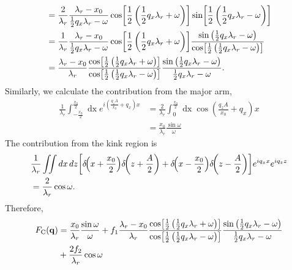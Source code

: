 \documentclass[12pt,letterpaper]{article}
\newcommand{\dx}{\mathop{dx}}
\newcommand{\dz}{\mathop{dz}}
\newcommand{\FC}{F_\mathrm{C}}
\begin{document}
\begin{align}
  &= \frac{2}{\lambda_r}\frac{\lambda_r-x_0}{\frac{1}{2}q_x\lambda_r - \omega} 
     \cos\mathopen{}\left[ \frac{1}{2}\left(\frac{1}{2}q_x\lambda_r + \omega\right) \right]\mathclose{} 
     \sin\mathopen{}\left[ \frac{1}{2}\left(\frac{1}{2}q_x\lambda_r - \omega\right) \right]\mathclose{} \nonumber\\
  &= \frac{1}{\lambda_r}\frac{\lambda_r-x_0}{\frac{1}{2}q_x\lambda_r - \omega} 
     \cos\mathopen{}\left[ \frac{1}{2}\left(\frac{1}{2}q_x\lambda_r + \omega\right) \right]\mathclose{} 
     \frac{\sin\left(\frac{1}{2}q_x\lambda_r - \omega \right)}
          {\cos\mathopen{}\left[ \frac{1}{2}\left(\frac{1}{2}q_x\lambda_r - \omega\right) \right]\mathclose{}} \nonumber\\
  &= \frac{\lambda_r-x_0}{\lambda_r}
     \frac{\cos\mathopen{}\left[ \frac{1}{2}\left(\frac{1}{2}q_x\lambda_r + \omega\right) \right]\mathclose{}}
          {\cos\mathopen{}\left[ \frac{1}{2}\left(\frac{1}{2}q_x\lambda_r - \omega\right) \right]\mathclose{}}
     \frac{\sin\left(\frac{1}{2}q_x\lambda_r - \omega\right)}
          {\frac{1}{2}q_x\lambda_r - \omega}.
\end{align}
Similarly, we calculate the contribution from the major arm,
\begin{align}
  \frac{1}{\lambda_r}\int_{-\frac{x_0}{2}}^{\frac{x_0}{2}}\dx 
  e^{i\left(\frac{q_zA}{x_0} + q_x \right)x}
  &= \frac{2}{\lambda_r}\int_{0}^{\frac{x_0}{2}}\dx \cos\left(\frac{q_zA}{x_0} + q_x\right)x \nonumber\\ 
  &= \frac{x_0}{\lambda_r}\frac{\sin\omega}{\omega}
\end{align}
The contribution from the kink region is 
\begin{align}
  & \frac{1}{\lambda_r}\iint\dx\dz
  \bracks{\delta\!\pars{x+\frac{x_0}{2}}\delta\!\pars{z+\frac{A}{2}} 
   + \delta\!\pars{x-\frac{x_0}{2}}\delta\!\pars{z-\frac{A}{2}}}
  e^{iq_xx} e^{iq_zz} \nonumber\\
  &= \frac{2}{\lambda_r}\cos\omega.
\end{align}
Therefore,
\begin{align}
  \FC(\mathbf{q}) 
  &= \frac{x_0}{\lambda_r}\frac{\sin\omega}{\omega} + 
  f_1\frac{\lambda_r-x_0}{\lambda_r}
  \frac{\cos\bracks{\frac{1}{2}\left(\frac{1}{2}q_x\lambda_r + \omega\right)}}
       {\cos\bracks{\frac{1}{2}\left(\frac{1}{2}q_x\lambda_r - \omega\right)}}
  \frac{\sin\left(\frac{1}{2}q_x\lambda_r - \omega\right)}
       {\frac{1}{2}q_x\lambda_r - \omega} \nonumber\\
  &+ \frac{2f_2}{\lambda_r}\cos\omega
\end{align}


\end{document}
